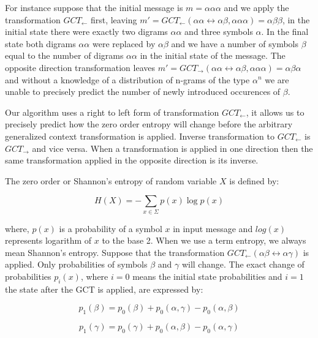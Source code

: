 \documentclass[smallabstract,smallcaptions]{dccpaper}
\begin{document}
For instance suppose that the initial message is $m=\alpha\alpha\alpha$ and we apply the transformation $GCT_{\leftarrow}$ first, leaving $m' = GCT_{\leftarrow}(\alpha\alpha\leftrightarrow\alpha\beta, \alpha\alpha\alpha) = \alpha\beta\beta$, in the initial state there were exactly two digrams $\alpha\alpha$ and three symbols $\alpha$. In the final state both digrams $\alpha\alpha$ were replaced by $\alpha\beta$ and we have a number of symbols $\beta$ equal to the number of digrams $\alpha\alpha$ in the initial state of the message. The opposite direction transformation leaves $m' = GCT_{\rightarrow}(\alpha\alpha\leftrightarrow\alpha\beta, \alpha\alpha\alpha) = \alpha\beta\alpha$ and without a knowledge of a distribution of n-grams of the type $\alpha^n$ we are unable to precisely predict the number of newly introduced occurences of $\beta$.

Our algorithm uses a right to left form of transformation $GCT_{\leftarrow}$, it allows us to precisely predict how the zero order entropy will change before the arbitrary generalized context transformation is applied. Inverse transformation to $GCT_{\leftarrow}$ is $GCT_{\rightarrow}$ and vice versa. When a transformation is applied in one direction then the same transformation applied in the opposite direction is its inverse\cite{vasinek15}.

\label{sec:H-red}

The zero order or Shannon's\cite{shannon1948} entropy of random variable $X$ is defined  by:

\begin{equation}
H(X)=-\sum_{x\in\Sigma}p(x)\log p(x)
\end{equation}

where, $p(x)$ is a probability of a symbol $x$ in input message and $log(x)$ represents logarithm of $x$ to the base 2. When we use a term entropy, we always mean Shannon's entropy. Suppose that the transformation $GCT_{\leftarrow}(\alpha\beta\leftrightarrow\alpha\gamma)$ is applied. Only probabilities of symbols $\beta$ and $\gamma$ will change. The exact change of probabilities $p_i(x)$, where $i=0$ means the initial state probabilities and $i=1$ the state after the GCT is applied, are expressed by:

\begin{equation}
p_{1}(\beta) = p_{0}(\beta) + p_{0}(\alpha,\gamma) - p_{0}(\alpha,\beta)
\end{equation}

\begin{equation}
p_{1}(\gamma) = p_{0}(\gamma) + p_{0}(\alpha,\beta) - p_{0}(\alpha,\gamma)
\end{equation}
\end{document}
